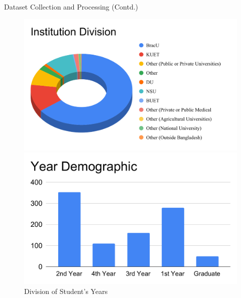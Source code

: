 \documentclass{beamer}
\begin{document}
\begin{frame}{Dataset Collection and Processing (Contd.)}
\begin{figure}
    \centering
    \begin{minipage}{0.48\linewidth}
        \centering
        \includegraphics[width=\linewidth]{Institution Division.pdf}
        \caption{Description of Institutions of our Data Collection}
        \label{fig: Institution}
    \end{minipage}
    \hfill
    \begin{minipage}{0.48\linewidth}
        \centering
        \includegraphics[width=\linewidth]{Year Demographic.pdf}
        \caption{Division of Student's Years}
        \label{fig:Year}
    \end{minipage}
\end{figure}
\end{frame}
\end{document}
